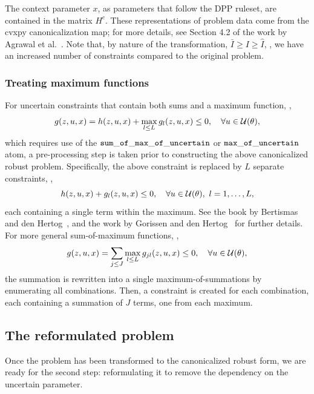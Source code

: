 The context parameter $x$, as parameters that follow the \gls{DPP} ruleset, are contained in the matrix $H^c$.
These representations of problem data come from the cvxpy canonicalization map; for more details, see Section 4.2 of the work by Agrawal et al.~\cite{diamond2016cvxpy}.
Note that, by nature of the transformation, $\bar{I} \geq I \geq \hat{I}$, \ie, we have an increased number of constraints compared to the original problem. 

\subsubsection{Treating maximum functions}
\label{sec:max_reform}
For uncertain constraints that contain both sums and a maximum function, \ie,
$$g(z,u,x) = h(z,u,x) + \max_{l\leq L}g_l(z,u,x) \leq 0, \quad \forall u \in {\mathcal{U}}(\theta),$$
which requires use of the $\tt{sum\_of\_max\_of\_uncertain}$ or $\tt{max\_of\_uncertain}$ atom,
a pre-processing step is taken prior to constructing the above canonicalized robust problem. 
Specifically, the above constraint is replaced by $L$ separate constraints, \ie,
 $$h(z,u,x) + g_l(z,u,x) \leq 0, \quad \forall u \in {\mathcal{U}}(\theta),~l = 1,\dots,L,$$
 each containing a single term within the maximum. 
See the book by Bertismas and den Hertog~\cite[Section 12]{robustadaptopt}, and the work by Gorissen and den Hertog~\cite{max-cons} for further details.
For more general sum-of-maximum functions, \ie, 
$$g(z,u,x) = \sum_{j\leq J} \max_{l\leq L}g_{jl}(z,u,x) \leq 0, \quad \forall u \in {\mathcal{U}}(\theta),$$
the summation is rewritten into a single maximum-of-summations by enumerating all combinations. 
Then, a constraint is created for each combination, each containing a summation of $J$ terms, one from each maximum.

\subsection{The reformulated problem}
Once the problem has been transformed to the canonicalized robust form, we are ready for the second step: reformulating it to remove the dependency on the uncertain parameter. 

